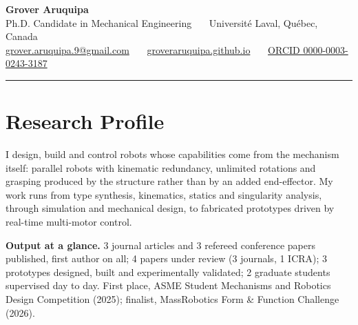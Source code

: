 \documentclass[11pt,letterpaper]{article}
\begin{document}
\begin{center}
{\LARGE\bfseries\color{ink} Grover Aruquipa}\\[4pt]
{\small Ph.D. Candidate in Mechanical Engineering \ \textbullet\ \ Universit\'e Laval, Qu\'ebec, Canada}\\[3pt]
{\footnotesize
\href{mailto:grover.aruquipa.9@gmail.com}{grover.aruquipa.9@gmail.com} \ \textbullet\ \
\href{https://groveraruquipa.github.io}{groveraruquipa.github.io} \ \textbullet\ \
\href{https://orcid.org/0000-0003-0243-3187}{ORCID 0000-0003-0243-3187}}\\[4pt]
{\color{ink}\rule{0.55\linewidth}{1.1pt}}
\end{center}

\section{Research Profile}
{\footnotesize I design, build and control robots whose capabilities come from the mechanism itself: parallel robots
with kinematic redundancy, unlimited rotations and grasping produced by the structure rather than by an added
end-effector. My work runs from type synthesis, kinematics, statics and singularity analysis, through simulation and
mechanical design, to fabricated prototypes driven by real-time multi-motor control.\par
\vspace{3pt}
\textbf{Output at a glance.} 3 journal articles and 3 refereed conference papers published, first author on all;
4 papers under review (3 journals, 1 ICRA); 3 prototypes designed, built and experimentally validated; 2 graduate students supervised day to day. First place, ASME Student Mechanisms and Robotics Design
Competition (2025); finalist, MassRobotics Form \& Function Challenge (2026).}

\end{document}

